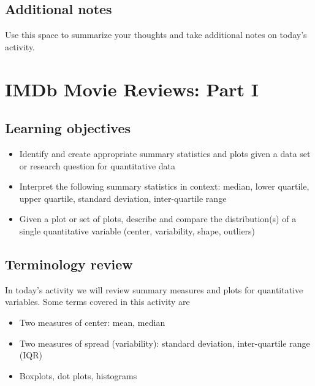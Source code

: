 \documentclass[
]{report}
\providecommand{\tightlist}{%
  \setlength{\itemsep}{0pt}\setlength{\parskip}{0pt}}
\begin{document}
\hypertarget{additional-notes}{%
\section{Additional notes}\label{additional-notes}}

Use this space to summarize your thoughts and take additional notes on today's activity.

\hypertarget{imdb-movie-reviews-part-i}{%
\chapter{IMDb Movie Reviews: Part I}\label{imdb-movie-reviews-part-i}}

\hypertarget{learning-objectives}{%
\section{Learning objectives}\label{learning-objectives}}

\begin{itemize}
\item
  Identify and create appropriate summary statistics and plots
  given a data set or research question for quantitative data
\item
  Interpret the following summary statistics in context:
  median, lower quartile, upper quartile,
  standard deviation, inter-quartile range
\item
  Given a plot or set of plots, describe and compare the distribution(s)
  of a single quantitative variable
  (center, variability, shape, outliers)
\end{itemize}

\hypertarget{terminology-review}{%
\section{Terminology review}\label{terminology-review}}

In today's activity we will review summary measures and plots for quantitative variables. Some terms covered in this activity are

\begin{itemize}
\tightlist
\item
  Two measures of center: mean, median
\item
  Two measures of spread (variability): standard deviation, inter-quartile range (IQR)
\item
  Boxplots, dot plots, histograms
\end{itemize}
\end{document}
